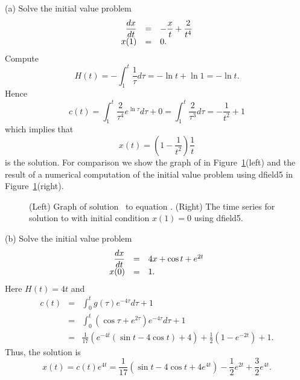 \documentclass{ximera}
\begin{document}
(a)   Solve the initial value problem
\begin{equation} \label{e:solntheq}
\begin{array}{rcl}
\displaystyle \frac{dx}{dt} & = & -\displaystyle \frac{x}{t} + \frac{2}{t^4}\\
x(1) & = & 0.
\end{array}
\end{equation}
Compute
\[
H(t)= -\int_1^t\frac{1}{\tau}d\tau = -\ln t +\ln 1 = -\ln t.
\]
Hence 
\[
c(t)=\int_1^t \frac{2}{\tau^4}e^{\ln\tau}d\tau + 0
=\int_1^t \frac{2}{\tau^3} d\tau = -\frac{1}{t^2}+1
\]
which implies that 
\begin{equation}  \label{e:solnth}
x(t)=\left(1-\frac{1}{t^2}\right)\frac{1}{t}
\end{equation}
is the solution. For comparison we show the graph of  in 
Figure~\ref{F:solnmd}(left) and the result of a numerical computation of 
the initial value problem using {\sf dfield5} 
in Figure~\ref{F:solnmd}(right).

\begin{figure}[htb]
           \centerline{%
           }
           \caption{(Left) Graph of solution~\protect{} to equation 
	\protect{}. (Right) The time series for solution to 
	\protect{} with initial condition $x(1)=0$ using 
	{\sf dfield5}.}
           \label{F:solnmd}
\end{figure}

\noindent (b) Solve the initial value problem
\[
\begin{array}{rcl}
\displaystyle \frac{dx}{dt} & = & 4x + \cos t + e^{2t} \\
x(0) & = & 1.
\end{array}
\]
Here $H(t)=4t$ and 
\begin{eqnarray*}
c(t) & = &  \int_0^t g(\tau)e^{-4\tau} d\tau +1\\
& = & \int_0^t \left(\cos\tau + e^{2\tau}\right)e^{-4\tau} d\tau
+1\\
& = & \frac{1}{17}\left( e^{-4t}(\sin t - 4\cos t)+4\right) +
\frac{1}{2}\left(1-e^{-2t}\right) + 1.
\end{eqnarray*}
Thus, the solution is
\[
x(t)=c(t) e^{4t} = \frac{1}{17}(\sin t - 4\cos t+4e^{4t}) -
\frac{1}{2}e^{2t} + \frac{3}{2}e^{4t}.
\]


\EXER

\TEXER 
\end{document}
